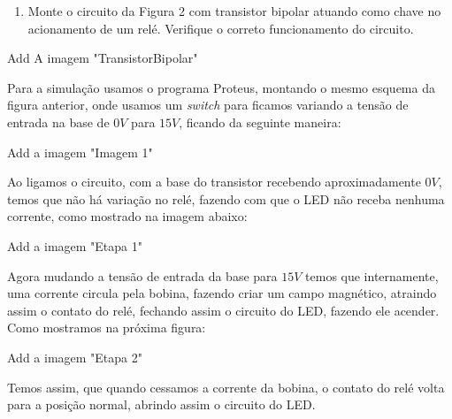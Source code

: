\begin{enumerate}
	\item Monte o circuito da Figura 2 com transistor bipolar atuando como chave no acionamento de um relé. Verifique o correto funcionamento do circuito.
\end{enumerate}
	
	Add A imagem "TransistorBipolar"
	
Para a simulação usamos o programa Proteus, montando o mesmo esquema da figura anterior, onde usamos um \textit{switch}  para ficamos variando a tensão de entrada na base de $ 0 V $ para $ 15 V $, ficando da seguinte maneira:

	Add a imagem "Imagem 1"

Ao ligamos o circuito, com a base do transistor recebendo aproximadamente $ 0 V $, temos que não há variação no relé, fazendo com que o LED não receba nenhuma corrente, como mostrado na imagem abaixo:

	Add a imagem "Etapa 1"
	
Agora mudando a tensão de entrada da base para $ 15 V $ temos que internamente, uma corrente circula pela bobina, fazendo criar um campo magnético, atraindo assim o contato do relé, fechando assim o circuito do LED, fazendo ele acender. Como mostramos na próxima figura:

	Add a imagem "Etapa 2"
	
Temos assim, que quando cessamos a corrente da bobina, o contato do relé volta para a posição normal, abrindo assim o circuito do LED.
	
	

